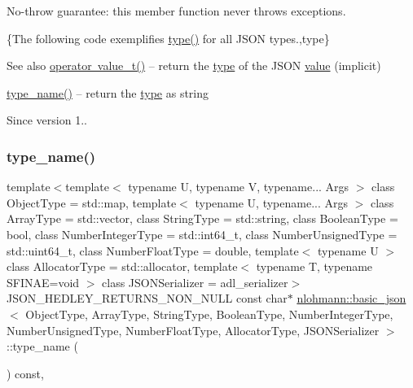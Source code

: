 No-\/throw guarantee\+: this member function never throws exceptions.

\{The following code exemplifies {\ttfamily \mbox{\hyperlink{classnlohmann_1_1basic__json_a2b2d781d7f2a4ee41bc0016e931cadf7}{type()}}} for all J\+S\+ON types.,type\}

\begin{DoxySeeAlso}{See also}
\mbox{\hyperlink{classnlohmann_1_1basic__json_a26ef3058e249f82a04f8ec18f7419027}{operator value\+\_\+t()}} -- return the \mbox{\hyperlink{classnlohmann_1_1basic__json_a2b2d781d7f2a4ee41bc0016e931cadf7}{type}} of the J\+S\+ON \mbox{\hyperlink{classnlohmann_1_1basic__json_adcf8ca5079f5db993820bf50036bf45d}{value}} (implicit) 

\mbox{\hyperlink{classnlohmann_1_1basic__json_a9d75f6b5393b23a683d69605f9fb1f55}{type\+\_\+name()}} -- return the \mbox{\hyperlink{classnlohmann_1_1basic__json_a2b2d781d7f2a4ee41bc0016e931cadf7}{type}} as string
\end{DoxySeeAlso}
\begin{DoxySince}{Since}
version 1.. 
\end{DoxySince}
\mbox{\label{classnlohmann_1_1basic__json_a9d75f6b5393b23a683d69605f9fb1f55}} 
\subsubsection{\texorpdfstring{type\+\_\+name()}{type\_name()}}
{\footnotesize\ttfamily template$<$template$<$ typename U, typename V, typename... Args $>$ class Object\+Type = std\+::map, template$<$ typename U, typename... Args $>$ class Array\+Type = std\+::vector, class String\+Type  = std\+::string, class Boolean\+Type  = bool, class Number\+Integer\+Type  = std\+::int64\+\_\+t, class Number\+Unsigned\+Type  = std\+::uint64\+\_\+t, class Number\+Float\+Type  = double, template$<$ typename U $>$ class Allocator\+Type = std\+::allocator, template$<$ typename T, typename S\+F\+I\+N\+A\+E=void $>$ class J\+S\+O\+N\+Serializer = adl\+\_\+serializer$>$ \\
J\+S\+O\+N\+\_\+\+H\+E\+D\+L\+E\+Y\+\_\+\+R\+E\+T\+U\+R\+N\+S\+\_\+\+N\+O\+N\+\_\+\+N\+U\+LL const char$\ast$ \mbox{\hyperlink{classnlohmann_1_1basic__json}{nlohmann\+::basic\+\_\+json}}$<$ Object\+Type, Array\+Type, String\+Type, Boolean\+Type, Number\+Integer\+Type, Number\+Unsigned\+Type, Number\+Float\+Type, Allocator\+Type, J\+S\+O\+N\+Serializer $>$\+::type\+\_\+name (\begin{DoxyParamCaption}{ }\end{DoxyParamCaption}) const\hspace{0.3cm}{\ttfamily [inline]}, {\ttfamily [noexcept]}}



